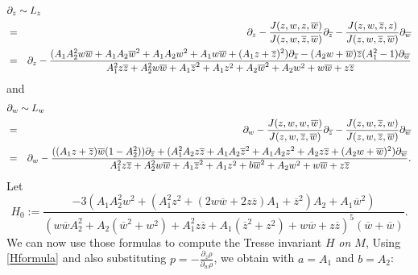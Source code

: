 \documentclass[12pt]{amsart}
\begin{document}
\begin{eqnarray*}
\lefteqn{\partial_z\sim L_z}\\
&=&\partial_z-\frac{J(z,w,z,\overline{w})}{J(z,w,\overline{z},\overline{w})}\partial_{\overline{z}}-\frac{J(z,w,\overline{z},z)}{J(z,w,\overline{z},\overline{w})}\partial_{\overline{w}}\\
&=&
\partial_z-\frac{(A_1 A_2^2 w\overline{w}+A_1 A_2\overline{w}^2+A_1 A_2 w^2+A_1w\overline{w}+(A_1z+\overline{z})^2)\partial_{\overline{z}}-(A_2 w+\overline{w})\overline{z}(A_1^2-1)\partial_{\overline{w}}}{A_1^2 z\overline{z}+A_2^2 w\overline{w}+A_1\overline{z}^2+A_1z^2+A_2 \overline{w}^2+A_2 w^2+w\overline{w}+z\overline{z}}\\
\end{eqnarray*}
and
\begin{eqnarray*}
\lefteqn{\partial_w\sim L_w}\\
&=&\partial_w-\frac{J(z,w,w,\overline{w})}{J(z,w,\overline{z},\overline{w})}\partial_{\overline{z}}-\frac{J(z,w,\overline{z},w)}{J(z,w,\overline{z},\overline{w})}\partial_{\overline{w}}\\
&=&
\partial_w-\frac{((A_1 z+\overline{z})\overline{w}(1-A_2^2))\partial_{\overline{z}}+(A_1^2 A_2 z\overline{z}+A_1 A_2 \overline{z}^2+A_1 A_2 z^2+A_2 z\overline{z}+(A_2 w +\overline{w})^2)\partial_{\overline{w}}}
{A_1^2 z\overline{z}+A_2^2 w\overline{w}+A_1\overline{z}^2+A_1 z^2+b\overline{w}^2+A_2 w^2+w\overline{w}+z\overline{z}}.
\end{eqnarray*}
Let 
$$
H_0:=\frac{-3( A_1 A_2^2 {w}^{2}+ ( A_1^{2}{z}^{2}+
 ( 2w{ \overline{w}}+2z{ \overline{z}} ) A_1+{{ \overline{z}}}^{2} ) A_2+A_1
{{ \overline{w}}}^{2} ) } {( w{ \overline{w}}A_2^{2}+A_2 ( {{ \overline{w}}}^
{2}+{w}^{2} ) +A_1^{2}z{ \overline{z}}+A_1 ( {{ \overline{z}}}^{2}+{z}^{2}
 ) +w{ \overline{w}}+z{ \overline{z}} ) ^{5} ( \overline{w}+{ \overline{w}}
 )}.
 $$
We can now use those formulas to compute the Tresse invariant $H$ {\it on $M$}, Using
\eqref{Hformula} and also substituting $p=-\frac{\partial_z \rho}{\partial_w \rho}$, we  obtain with $a=A_1$ and $b=A_2$:
\end{document}
